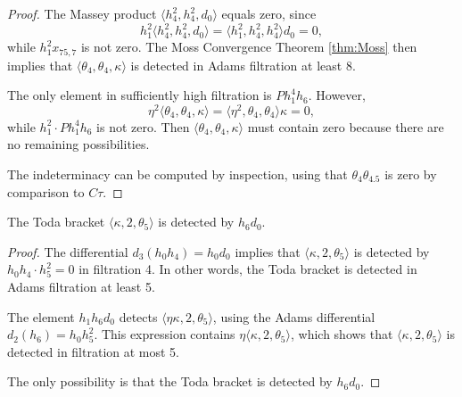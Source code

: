 \begin{proof}
The Massey product $\langle h_4^2, h_4^2, d_0 \rangle$ equals zero,
since
\[
h_1^2 \langle h_4^2, h_4^2, d_0 \rangle =
\langle h_1^2, h_4^2, h_4^2 \rangle d_0 = 0,
\]
while $h_1^2 x_{75,7}$ is not zero.
The Moss Convergence Theorem \ref{thm:Moss} then implies
that $\langle \theta_4, \theta_4, \kappa \rangle$
is detected in Adams filtration at least $8$.

The only element in sufficiently high filtration is $P h_1^4 h_6$.
However,
\[
\eta^2 \langle \theta_4, \theta_4, \kappa \rangle =
\langle \eta^2, \theta_4, \theta_4 \rangle \kappa = 0,
\]
while $h_1^2 \cdot P h_1^4 h_6$ is not zero.
Then 
$\langle \theta_4, \theta_4, \kappa \rangle$ must contain zero because
there are no remaining possibilities.

The indeterminacy can be computed by inspection, using that
$\theta_4 \theta_{4.5}$ is zero by comparison to $C\tau$.
\end{proof}

\begin{lemma}
\label{lem:kappa,2,theta5}
The Toda bracket
$\langle \kappa, 2, \theta_5 \rangle$
is detected by $h_6 d_0$.
\end{lemma}

\begin{proof}
The differential $d_3(h_0 h_4) = h_0 d_0$ implies that
$\langle \kappa, 2, \theta_5 \rangle$
is detected by $h_0 h_4 \cdot h_5^2 = 0$ in filtration 4.
In other words, the Toda bracket is detected in Adams filtration
at least 5.

The element $h_1 h_6 d_0$ detects
$\langle \eta \kappa, 2, \theta_5 \rangle$, 
using the Adams differential $d_2(h_6) = h_0 h_5^2$.
This expression contains
$\eta \langle \kappa, 2, \theta_5 \rangle$, which shows that
$\langle \kappa, 2, \theta_5 \rangle$ is detected 
in filtration at most 5.

The only possibility is that the Toda bracket is detected by $h_6 d_0$. 
\end{proof}

